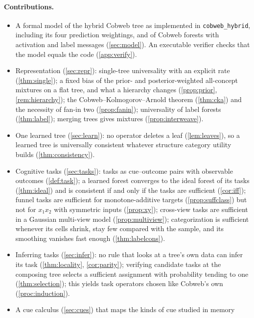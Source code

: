 \documentclass[11pt]{article}
\theoremstyle{definition}
\theoremstyle{remark}
\begin{document}
\paragraph{Contributions.}
\begin{itemize}[leftmargin=*]
\item A formal model of the hybrid Cobweb tree as implemented in
  \texttt{cobweb\_hybrid}, including its four prediction weightings, and of Cobweb
  forests with activation and label messages (\cref{sec:model}).  An executable verifier
  checks that the model equals the code (\cref{app:verify}).
\item Representation (\cref{sec:repr}): single-tree universality with an explicit
  rate (\cref{thm:single}); a fixed bias of the prior- and posterior-weighted
  all-concept mixtures on a flat tree, and what a hierarchy changes (\cref{prop:prior},
  \cref{rem:hierarchy}); the Cobweb--Kolmogorov--Arnold theorem (\cref{thm:cka}) and the
  necessity of fan-in two (\cref{prop:fanin}); universality of label forests
  (\cref{thm:label}); merging trees gives mixtures (\cref{prop:interweave}).
\item One learned tree (\cref{sec:learn}): no operator deletes a leaf
  (\cref{lem:leaves}), so a learned tree is universally consistent whatever structure
  category utility builds (\cref{thm:consistency}).
\item Cognitive tasks (\cref{sec:tasks}): tasks as cue--outcome pairs with observable
  outcomes (\cref{def:task}); a learned forest converges to the ideal forest of its tasks
  (\cref{thm:ideal}) and is consistent if and only if the tasks are sufficient
  (\cref{cor:iff}); funnel tasks are sufficient for monotone-additive targets
  (\cref{prop:suffclass}) but not for $x_1x_2$ with symmetric inputs (\cref{prop:xy});
  cross-view tasks are sufficient in a Gaussian multi-view model (\cref{prop:multiview});
  categorization is sufficient whenever its cells shrink, stay few compared with the
  sample, and its smoothing vanishes fast enough (\cref{thm:labelcons}).
\item Inferring tasks (\cref{sec:infer}): no rule that looks at a tree's own data can
  infer its task (\cref{thm:locality}, \cref{cor:parity}); verifying candidate tasks at
  the composing tree selects a sufficient assignment with probability tending to one
  (\cref{thm:selection}); this yields task operators chosen like Cobweb's own
  (\cref{proc:induction}).
\item A cue calculus (\cref{sec:cues}) that maps the kinds of cue studied in memory

\end{itemize}
\end{document}

